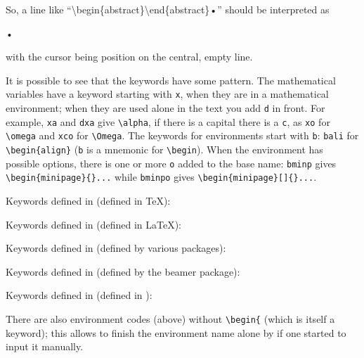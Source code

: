 So, a line like ``\textbackslash begin\{abstract\}{\AutoCompRet}{\AutoCompIns}{\AutoCompRet}\textbackslash end\{abstract\}•'' should be interpreted as
\begin{verbExample}
\begin{abstract}

\end{abstract}•
\end{verbExample}
with the cursor being position on the central, empty line.

It is possible to see that the keywords have some pattern. The mathematical variables have a keyword starting with \verb|x|, when they are in a mathematical environment; when they are used alone in the text you add \verb|d| in front. For example, \verb|xa| and \verb|dxa| give \verb|\alpha|, if there is a capital there is a \verb|c|, as  \verb|xo| for \verb|\omega| and \verb|xco| for \verb|\Omega|. The keywords for environments start with \verb|b|: \verb|bali| for \verb|\begin{align}| (\verb|b| is a mnemonic for \verb|\begin|). When the environment has possible options, there is one or more \verb|o| added to the base name: \verb|bminp| gives \verb|\begin{minipage}{}...| while \verb|bminpo| gives \verb|\begin{minipage}[]{}...|.

%
Keywords defined in  (defined in \TeX):
%


Keywords defined in  (defined in \LaTeX):
%


Keywords defined in  (defined by various packages):


Keywords defined in  (defined by the beamer package):


Keywords defined in  (defined in \ConTeXt):


There are also environment codes (above) without \verb|\begin{| (which is itself a keyword); this allows to finish the environment name alone by  if one started to input it manually.

